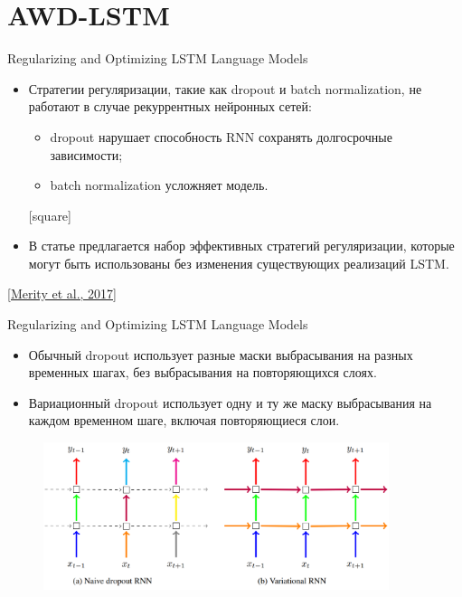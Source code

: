 \section{AWD-LSTM}
\begin{frame}[c]{Regularizing and Optimizing LSTM Language Models}
  \begin{itemize}
  	[square]
  	\item Стратегии регуляризации, такие как dropout и batch normalization, не работают в случае рекуррентных нейронных сетей:
	\begin{itemize}
		[circle]
		\item dropout нарушает способность RNN сохранять долгосрочные зависимости;
		\item batch normalization усложняет модель.
	\end{itemize}
	[square]
	\item В статье предлагается набор эффективных стратегий регуляризации, которые могут быть использованы без изменения существующих реализаций LSTM.
  \end{itemize}
\let\thefootnote\footnote{\href{https://arxiv.org/abs/1708.02182}{\color[rgb]{0.5,0.5,0.5} [Merity et al., 2017]}}
\end{frame}

\begin{frame}[c]{Regularizing and Optimizing LSTM Language Models}
\begin{itemize} 
	[square]
	\item Обычный dropout использует разные маски выбрасывания на разных временных шагах, без выбрасывания на повторяющихся слоях.
	\item Вариационный dropout использует одну и ту же маску выбрасывания на каждом временном шаге, включая повторяющиеся слои.
\end{itemize}
\begin{figure}
	\centering
	\includegraphics[width=0.9\textwidth]{figures/vardrop.png}
\end{figure}
\end{frame}


